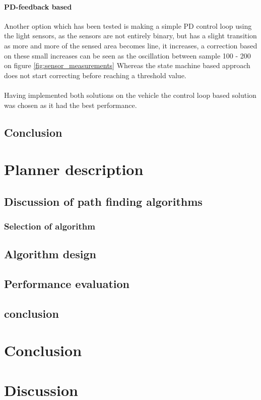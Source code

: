 \documentclass[draft, english, a4paper]{article}
\begin{document}
            \paragraph{PD-feedback based}
            Another option which has been tested is making a simple PD control loop
            using the light sensors, as the sensors are not entirely binary,
            but has a slight transition as more and more of the sensed area becomes
            line, it increases, a correction based on these small increases can 
            be seen as the oscillation between sample 100 - 200 on figure \ref{fig:sensor_measurements}
            Whereas the state machine based approach does not start correcting before reaching a threshold value.\\
            \\
            Having implemented both solutions on the vehicle the control loop based
            solution was chosen as it had the best performance.
	\subsection{Conclusion} %
\section{Planner description}
    
	\subsection{Discussion of path finding algorithms} %
		\subsubsection{Selection of algorithm}
	\subsection{Algorithm design}
	\subsection{Performance evaluation}
	\subsection{conclusion}
\section{Conclusion}
\section{Discussion}


\appendix
\end{document}

